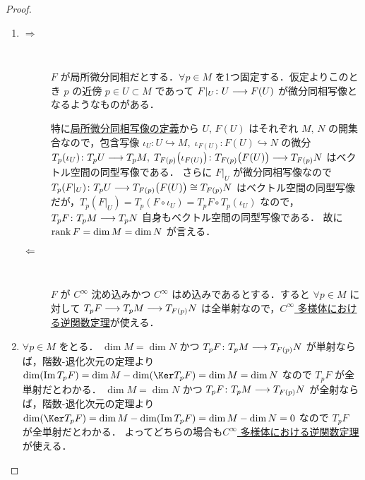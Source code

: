 \documentclass[TQFT_main]{subfiles}
\begin{document}
\begin{proof}
    \begin{enumerate}
        \item \begin{description}
            \item[\textbf{$\bm{\Longrightarrow}$}]　
            
            $F$ が局所微分同相だとする．$\forall p \in M$ を1つ固定する．仮定よりこのとき $p$ の近傍 $p \in U \subset M$ であって $F|_U \colon U \longrightarrow F(U)$ が微分同相写像となるようなものがある．

            特に\hyperref[def:loc-diffeo]{局所微分同相写像の定義}から $U,\, F(U)$ はそれぞれ $M,\, N$ の開集合なので，包含写像 $\iota_U \colon U \hookrightarrow M,\; \iota_{F(U)} \colon F(U) \hookrightarrow N$ の微分 $T_p (\iota_U) \colon T_p U \longrightarrow T_p M,\; T_{F(p)} \bigl( \iota_{F(U)} \bigr) \colon T_{F(p)} \bigl( F(U) \bigr) \longrightarrow T_{F(p)} N$ はベクトル空間の同型写像である．
            さらに $F|_U$ が微分同相写像なので $T_p (F|_U) \colon T_p U \longrightarrow T_{F(p)} \bigl( F(U) \bigr) \cong T_{F(p)} N$ はベクトル空間の同型写像だが，$T_p (F|_U) = T_p (F \circ \iota_U) = T_p F \circ T_p (\iota_U)$ なので，$T_p F \colon T_p M \longrightarrow T_p N$ 自身もベクトル空間の同型写像である．
            故に $\rank F = \dim M = \dim N$ が言える．
            \item[\textbf{$\bm{\Longleftarrow}$}]　
            
            $F$ が $C^\infty$ 沈め込みかつ $C^\infty$ はめ込みであるとする．すると $\forall p \in M$ に対して $T_p F \longrightarrow T_p M \longrightarrow T_{F(p)} N$ は全単射なので，\hyperref[thm:inverse-function-b]{$C^\infty$ 多様体における逆関数定理}が使える．
        \end{description}
        \item $\forall p \in M$ をとる．
        $\dim M = \dim N$ かつ $T_p F \colon T_p M \longrightarrow T_{F(p)}N$ が単射ならば，階数-退化次元の定理より $\dim (\Im T_p F) = \dim M - \dim (\Ker T_p F) = \dim M = \dim N$ なので $T_p F$ が全単射だとわかる．
        $\dim M = \dim N$ かつ $T_p F \colon T_p M \longrightarrow T_{F(p)}N$ が全射ならば，階数-退化次元の定理より $\dim (\Ker T_p F) = \dim M - \dim (\Im T_p F) = \dim M - \dim N = 0$ なので $T_p F$ が全単射だとわかる．
        よってどちらの場合も\hyperref[thm:inverse-function-b]{$C^\infty$ 多様体における逆関数定理}が使える．
    \end{enumerate}
\end{proof}
\end{document}
